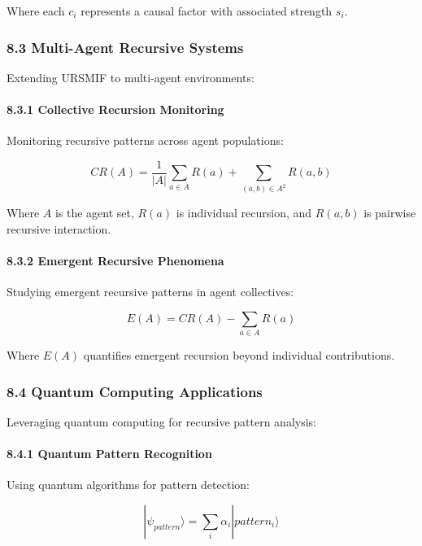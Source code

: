 \documentclass[
]{article}
\begin{document}
Where each \(c_i\) represents a causal factor with associated strength
\(s_i\).

\subsubsection{8.3 Multi-Agent Recursive
Systems}\label{multi-agent-recursive-systems}

Extending URSMIF to multi-agent environments:

\paragraph{8.3.1 Collective Recursion
Monitoring}\label{collective-recursion-monitoring}

Monitoring recursive patterns across agent populations:

\[CR(A) = \frac{1}{|A|} \sum_{a \in A} R(a) + \sum_{(a,b) \in A^2} R(a,b)\]

Where \(A\) is the agent set, \(R(a)\) is individual recursion, and
\(R(a,b)\) is pairwise recursive interaction.

\paragraph{8.3.2 Emergent Recursive
Phenomena}\label{emergent-recursive-phenomena}

Studying emergent recursive patterns in agent collectives:

\[E(A) = CR(A) - \sum_{a \in A} R(a)\]

Where \(E(A)\) quantifies emergent recursion beyond individual
contributions.

\subsubsection{8.4 Quantum Computing
Applications}\label{quantum-computing-applications}

Leveraging quantum computing for recursive pattern analysis:

\paragraph{8.4.1 Quantum Pattern
Recognition}\label{quantum-pattern-recognition}

Using quantum algorithms for pattern detection:

\[|\psi_{pattern}\rangle = \sum_{i} \alpha_i |pattern_i\rangle\]
\end{document}
